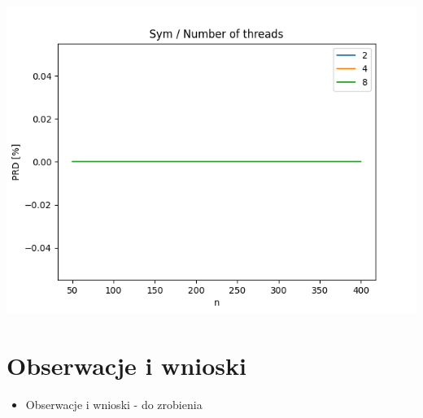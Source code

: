 \documentclass{article}
\begin{document}
\begin{center}
\includegraphics[width=\textwidth, 
                   height = 0.4\textheight, 
                   keepaspectratio]
                  {plots/sym_12_num_of_threads} 
\end{center}



\section{Obserwacje i wnioski}
\begin{itemize}
\item Obserwacje i wnioski - do zrobienia
\end{itemize}
\end{document}
